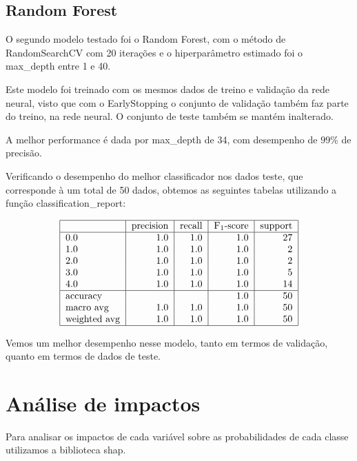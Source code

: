 \documentclass[12pt,a4paper]{article}
\theoremstyle{definition}
\theoremstyle{theoremdd}
\begin{document}
\subsection{Random Forest}

O segundo modelo testado foi o Random Forest, com o método de RandomSearchCV com 20 iterações e o hiperparâmetro estimado foi o max\_depth entre 1 e 40.


Este modelo foi treinado com os mesmos dados de treino e validação da rede neural, visto que com o EarlyStopping o conjunto de validação também faz parte do treino, na rede neural. O conjunto de teste também se mantém inalterado.

A melhor performance é dada por max\_depth de 34, com desempenho de $99\%$ de precisão.


Verificando o desempenho do melhor classificador nos dados teste, que corresponde à um total de 50 dados, obtemos as seguintes tabelas utilizando a função classification\_report:

\begin{displaymath}
\begin{tabular}{|l|r|r|r|r|}
\hline
{} &  precision &  recall &  F$_{1}$-score &  support \\
\hline
0.0          &        1.0 &     1.0 &       1.0 &     27 \\
1.0          &        1.0 &     1.0 &       1.0 &      2 \\
2.0          &        1.0 &     1.0 &       1.0 &      2 \\
3.0          &        1.0 &     1.0 &       1.0 &      5 \\
4.0          &        1.0 &     1.0 &       1.0 &     14 \\ \hline
accuracy     &        {} &     {} &       1.0 &      50 \\
macro avg    &        1.0 &     1.0 &       1.0 &     50 \\
weighted avg &        1.0 &     1.0 &       1.0 &     50 \\
\hline
\end{tabular}
\end{displaymath}

Vemos um melhor desempenho nesse modelo, tanto em termos de validação, quanto em termos de dados de teste.

\section{Análise de impactos}
Para analisar os impactos de cada variável sobre as probabilidades de cada classe utilizamos a biblioteca shap.
\end{document}
